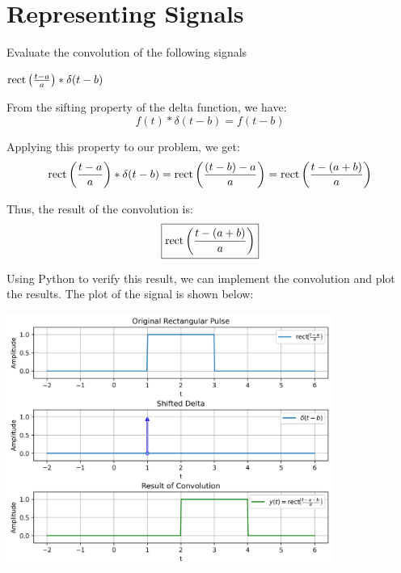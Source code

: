 \documentclass[a4paper, 10pt]{article}
\begin{document}
\subject[2110203 - Computer Engineering Mathematics II]


\section{Representing Signals}



\begin{problem}
Evaluate the convolution of the following signals
\end{problem}

\begin{subproblems}[start=1]
    \item \( \textrm{rect} \left( \frac{t-a}{a} \right) * \delta (t-b) \)
\end{subproblems}

\begin{solution}
From the sifting property of the delta function, we have:
\[ f(t) * \delta(t - b) = f(t - b) \]

Applying this property to our problem, we get:
\[ \textrm{rect} \left( \frac{t - a}{a} \right) * \delta(t - b) = \textrm{rect} \left( \frac{(t - b) - a}{a} \right) = \textrm{rect} \left( \frac{t - (a + b)}{a} \right) \]

Thus, the result of the convolution is:
\[ \boxed{ \textrm{rect} \left( \frac{t - (a + b)}{a} \right) } \]

Using Python to verify this result, we can implement the convolution and plot the results.
The plot of the signal is shown below:
\begin{center}
    \includegraphics[width=0.8\textwidth]{images/problem_1_1.png}
\end{center}
\end{solution}
\end{document}
